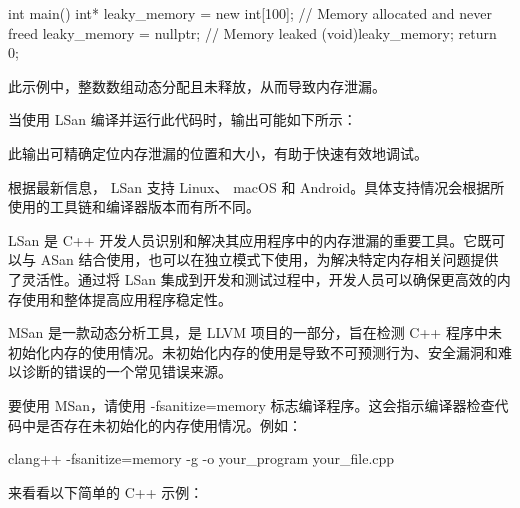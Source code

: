 \begin{cpp}
int main() {
    int* leaky_memory = new int[100]; // Memory allocated and never
    freed
    leaky_memory = nullptr; // Memory leaked
    (void)leaky_memory;
    return 0;
}
\end{cpp}

此示例中，整数数组动态分配且未释放，从而导致内存泄漏。

当使用 LSan 编译并运行此代码时，输出可能如下所示：


此输出可精确定位内存泄漏的位置和大小，有助于快速有效地调试。


根据最新信息， LSan 支持 Linux、 macOS 和 Android。具体支持情况会根据所使用的工具链和编译器版本而有所不同。

LSan 是 C++ 开发人员识别和解决其应用程序中的内存泄漏的重要工具。它既可以与 ASan 结合使用，也可以在独立模式下使用，为解决特定内存相关问题提供了灵活性。通过将 LSan 集成到开发和测试过程中，开发人员可以确保更高效的内存使用和整体提高应用程序稳定性。


MSan 是一款动态分析工具，是 LLVM 项目的一部分，旨在检测 C++ 程序中未初始化内存的使用情况。未初始化内存的使用是导致不可预测行为、安全漏洞和难以诊断的错误的一个常见错误来源。

要使用 MSan，请使用 -fsanitize=memory 标志编译程序。这会指示编译器检查代码中是否存在未初始化的内存使用情况。例如：

\begin{shell}
clang++ -fsanitize=memory -g -o your_program your_file.cpp
\end{shell}


来看看以下简单的 C++ 示例：

